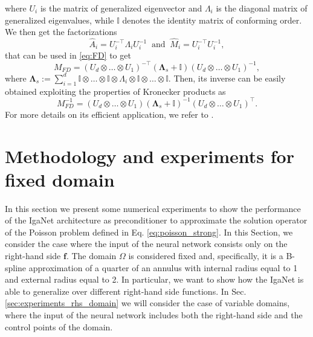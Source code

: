 \documentclass{article}
\theoremstyle{plain}
\numberwithin{equation}{section}
\begin{document}
\begin{itemize}
$$          $$
          where $U_i$ is the matrix of generalized eigenvector and $\Lambda_i$ is the diagonal matrix of generalized eigenvalues, while $\mathbb{I}$ denotes the identity matrix of conforming order. We then get the factorizations
          $$
              \widehat{A}_i= U_i^{-\top}\Lambda_iU_i^{-1} \ \text{ and } \ \widehat{M}_i=U_i^{-\top}U_i^{-1},
          $$
          that can be used in \eqref{eq:FD} to get
          $$
              M_{FD}= (U_d\otimes\dots \otimes U_1)^{-\top}(\mathbf{\Lambda}_s + \mathbb{I})(U_d\otimes\dots \otimes U_1)^{-1},
          $$
          where $\mathbf{\Lambda}_s:=\sum_{i=1}^d \mathbb{I}\otimes \dots \otimes \mathbb{I}\otimes \Lambda_i\otimes \mathbb{I}\otimes\dots\otimes \mathbb{I}$. Then, its inverse can be easily obtained exploiting the properties of Kronecker products as
          $$
              M_{FD}^{-1}= (U_d\otimes\dots \otimes U_1)(\mathbf{\Lambda}_s +\mathbb{I})^{-1}(U_d\otimes\dots \otimes U_1)^{\top}.
          $$
          For more details on its efficient application, we refer to \cite{sangalli2016isogeometric}.
\end{itemize}

\section{Methodology and experiments for fixed domain}\label{sec:experiments_fixed}
In this section we present some numerical experiments to show the performance of the IgaNet architecture as preconditioner to approximate the solution operator of the Poisson problem defined in Eq. \eqref{eq:poisson_strong}. In this Section, we consider the case where the input of the neural network consists only on the right-hand side $\mathbf{f}$. The domain $\Omega$ is considered fixed and, specifically, it is a B-spline approximation of a quarter of an annulus with internal radius equal to 1 and external radius equal to 2. In particular, we want to show how the IgaNet is able to generalize over different right-hand side functions. In Sec. \ref{sec:experiments_rhs_domain} we will consider the case of variable domains, where the input of the neural network includes both the right-hand side and the control points of the domain.

\end{document}
